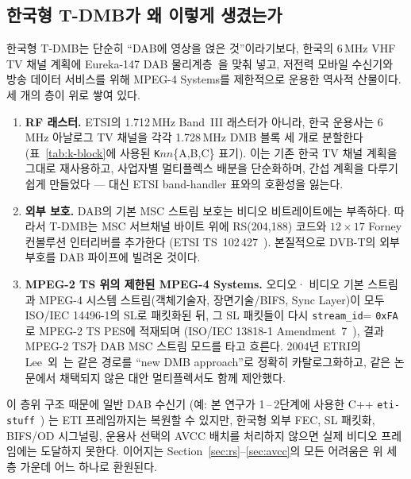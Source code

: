 \documentclass[11pt,a4paper]{article}
\begin{document}
\subsection{한국형 T-DMB가 왜 이렇게 생겼는가}\label{sec:why}

한국형 T-DMB는 단순히 ``DAB에 영상을 얹은 것''이라기보다,
한국의 6\,MHz VHF TV 채널 계획에 Eureka-147 DAB
물리계층~\cite{etsi300401}을 맞춰 넣고, 저전력 모바일 수신기와
방송 데이터 서비스를 위해 MPEG-4 Systems를 제한적으로 운용한
역사적 산물이다.  세 개의 층이 위로 쌓여 있다.

\begin{enumerate}[leftmargin=*,nosep]
\item \textbf{RF 래스터.}  ETSI의 1.712\,MHz Band~III 래스터가
       아니라, 한국 운용사는 6\,MHz 아날로그 TV 채널을 각각
       1.728\,MHz DMB 블록 세 개로 분할한다 (표~\ref{tab:k-block}에
       사용된 \texttt{K}$nn$\{A,B,C\} 표기).  이는 기존 한국
       TV 채널 계획을 그대로 재사용하고, 사업자별 멀티플렉스
       배분을 단순화하며, 간섭 계획을 다루기 쉽게 만들었다 ---
       대신 ETSI band-handler 표와의 호환성을 잃는다.
\item \textbf{외부 보호.}  DAB의 기본 MSC 스트림 보호는 비디오
       비트레이트에는 부족하다.  따라서 T-DMB는 MSC 서브채널
       바이트 위에 RS(204,188) 코드와 $12{\times}17$ Forney
       컨볼루션 인터리버를 추가한다 (ETSI
       TS~102\,427~\cite{etsi102427}).  본질적으로 DVB-T의 외부
       부호를 DAB 파이프에 빌려온 것이다.
\item \textbf{MPEG-2 TS 위의 제한된 MPEG-4 Systems.}  오디오·
       비디오 기본 스트림과 MPEG-4 시스템 스트림(객체기술자,
       장면기술/BIFS, Sync Layer)이 모두 ISO/IEC 14496-1의 SL로
       패킷화된 뒤, 그 SL 패킷들이 다시 \texttt{stream\_id}=
       \texttt{0xFA}로 MPEG-2 TS PES에 적재되며 (ISO/IEC 13818-1
       Amendment~7~\cite{iso13818-1-amd7}), 결과 MPEG-2 TS가
       DAB MSC 스트림 모드를 타고 흐른다.  2004년 ETRI의
       Lee~외~\cite{lee2004m4smux}는 같은 경로를 ``new DMB
       approach''로 정확히 카탈로그화하고, 같은 논문에서 채택되지
       않은 대안 멀티플렉서도 함께 제안했다.
\end{enumerate}

이 층위 구조 때문에 일반 DAB 수신기 (예: 본 연구가 1\,--\,2단계에
사용한 C++ \texttt{eti-stuff}~\cite{etistuff}) 는 ETI 프레임까지는
복원할 수 있지만, 한국형 외부 FEC, SL 패킷화, BIFS/OD 시그널링,
운용사 선택의 AVCC 배치를 처리하지 않으면 실제 비디오 프레임에는
도달하지 못한다.  이어지는 Section~\ref{sec:rs}--\ref{sec:avcc}의
모든 어려움은 위 세 층 가운데 어느 하나로 환원된다.
\end{document}
